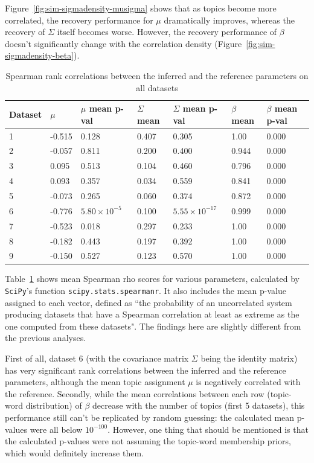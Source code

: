 \documentclass[12pt,a4paper,twoside,openright]{report}
\begin{document}
Figure~\ref{fig:sim-sigmadensity-musigma} shows that as topics become more correlated, the recovery performance for $\mu$ dramatically improves, whereas the recovery of $\Sigma$ itself becomes worse. However, the recovery performance of $\beta$ doesn't significantly change with the correlation density (Figure~\ref{fig:sim-sigmadensity-beta}).

\begin{table}
\begin{tabular}{| l | l | l | l | l | l | l |}
\hline
Dataset & $\mu$ & $\mu$ mean p-val & $\Sigma$ mean & $\Sigma$ mean p-val & $\beta$ mean & $\beta$ mean p-val\\
\hline
1 & -0.515 & 0.128 & 0.407 & 0.305 & 1.00 & 0.000 \\
2 & -0.057 & 0.811 & 0.200 & 0.400 & 0.944 & 0.000 \\
3 & 0.095 & 0.513 & 0.104 & 0.460 & 0.796 & 0.000 \\
4 & 0.093 & 0.357 & 0.034 & 0.559 & 0.841 & 0.000 \\
5 & -0.073 & 0.265 & 0.060 & 0.374 & 0.872 & 0.000 \\
6 & -0.776 & $5.80 \times 10 ^ {-5}$ & 0.100 & $5.55 \times 10^{-17}$ & 0.999 & 0.000 \\
7 & -0.523 & 0.018 & 0.297 & 0.233 & 1.00 & 0.000 \\
8 & -0.182 & 0.443 & 0.197 & 0.392 & 1.00 & 0.000 \\
9 & -0.150 & 0.527 & 0.123 & 0.570 & 1.00 & 0.000 \\
\hline
\end{tabular}
\caption{Spearman rank correlations between the inferred and the reference parameters on all datasets}
\label{tab:sim-spearman-params}
\end{table}

Table~\ref{tab:sim-spearman-params} shows mean Spearman rho scores for various parameters, calculated by \texttt{SciPy}'s function \texttt{scipy.stats.spearmanr}. It also includes the mean p-value assigned to each vector, defined as ``the probability of an uncorrelated system producing datasets that have a Spearman correlation at least as extreme as the one computed from these datasets". The findings here are slightly different from the previous analyses.

First of all, dataset 6 (with the covariance matrix $\Sigma$ being the identity matrix) has very significant rank correlations between the inferred and the reference parameters, although the mean topic assignment $\mu$ is negatively correlated with the reference. Secondly, while the mean correlations between each row (topic-word distribution) of $\beta$ decrease with the number of topics (first 5 datasets), this performance still can't be replicated by random guessing: the calculated mean p-values were all below $10^{-100}$. However, one thing that should be mentioned is that the calculated p-values were not assuming the topic-word membership priors, which would definitely increase them.
\end{document}
